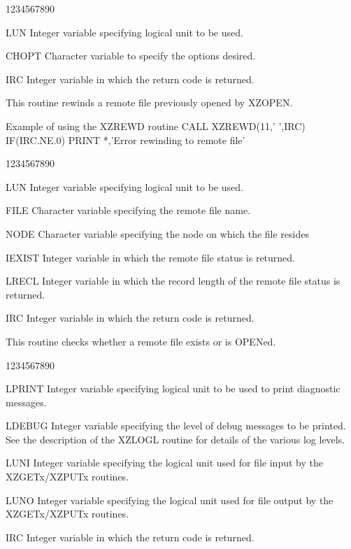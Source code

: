 \begin{DLtt}{1234567890}
\item[LUN]Integer variable specifying logical unit to be used.
\item[CHOPT]Character variable to specify the options desired.
\item[IRC]Integer variable in which the return code is returned.
\end{DLtt}
\par
This routine rewinds a remote file
previously opened by XZOPEN.
\begin{XMPt}{Example of using the XZREWD routine}
      CALL XZREWD(11,' ',IRC)
      IF(IRC.NE.0) PRINT *,'Error rewinding to remote file'
\end{XMPt}
\begin{DLtt}{1234567890}
\item[LUN]Integer variable specifying logical unit to be used.
\item[FILE]Character variable specifying the remote file name.
\item[NODE]Character variable specifying the node on which the
file resides
\item[IEXIST]Integer variable in which the remote file status is returned.
\item[LRECL]Integer variable in which the record length of the
remote file status is returned.
\item[IRC]Integer variable in which the return code is returned.
\end{DLtt}
\par
This routine checks whether a remote file exists or is OPENed.
\begin{DLtt}{1234567890}
\item[LPRINT]Integer variable specifying logical unit to be used to
print diagnostic messages.
\item[LDEBUG]Integer variable specifying the level of debug messages
to be printed.
See the description of the XZLOGL routine for details of the
various log levels.
\item[LUNI]Integer variable specifying the logical unit used for file input
by the XZGETx/XZPUTx routines.
\item[LUNO]Integer variable specifying the logical unit used for file output
by the XZGETx/XZPUTx routines.
\item[IRC]Integer variable in which the return code is returned.
\end{DLtt}

